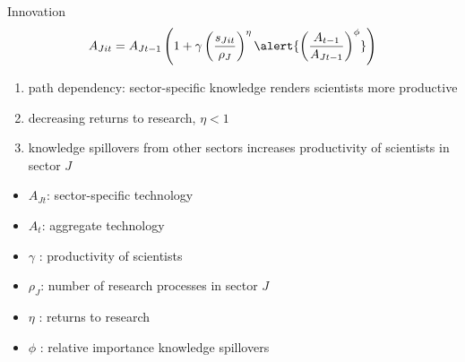 \documentclass[11pt,aspectratio=169]{beamer}
\begin{document}
\addtocounter{framenumber}{-1}
\begin{frame}{Innovation}
	\large
	\begin{align*}
		A_{Jit}={A_{Jt-1}}\left(1+\gamma\left(\frac{s_{Jit}}{\rho_J}\right)^\eta\alert{\left(\frac{A_{t-1}}{A_{Jt-1}}\right)^\phi}\right)
	\end{align*}
	\normalsize
	\begin{enumerate}
		\item path dependency: sector-specific knowledge renders scientists more productive
		\item decreasing returns to research, $\eta<1$
		\item \alert{knowledge spillovers} from other sectors increases productivity of scientists in sector $J$ \footnotesize{\citep{Barbieri2021GreenPolicy}}
	\end{enumerate}
	\small
	\vspace{4mm}
	\hspace{-2mm}
	\begin{minipage}[t!]{0.43\textwidth}
		\vspace{0mm}
		\begin{itemize}
			\item[] $A_{Jt}$: sector-specific technology
			\vspace{-2mm}		
			\item[] $A_t$: aggregate technology 
			\vspace{-2mm}
			\item[] $\gamma$ : productivity of scientists
		\end{itemize}
	\end{minipage}
	\vspace{-5mm}
	\begin{minipage}[t!]{0.55\textwidth}
		\vspace{0mm}
		\begin{itemize}	
			\item[] $\rho_J$: number of research processes in sector $J$
			\vspace{-2mm}			
			\item[] $\eta$ : returns to research
			\vspace{-2mm}			
			\item[] $\phi$ : relative importance knowledge spillovers
		\end{itemize}
	\end{minipage}
\end{frame}
\end{document}
